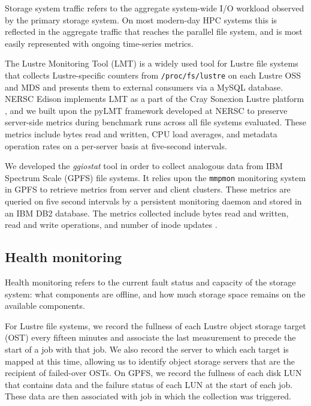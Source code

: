 Storage system traffic refers to the aggregate system-wide I/O workload
observed by the primary storage system.  On most modern-day HPC systems this
is reflected in the aggregate traffic that reaches the parallel file
system, and is most easily represented with ongoing time-series metrics.

\label{sec:methods/lmt}
The Lustre Monitoring Tool (LMT) is a widely used tool for Lustre file systems that collects Lustre-specific counters from \texttt{/proc/fs/lustre} on each Lustre OSS and MDS and presents them to external consumers via a MySQL database.
NERSC Edison implements LMT
as a part of the Cray Sonexion Lustre platform \cite{Keopp2014}, and we built
upon the pyLMT framework developed at NERSC \cite{Uselton2009} to preserve
server-side metrics during benchmark runs across all file systems evaluated.
These metrics include bytes read and written, CPU load averages, and metadata
operation rates on a per-server basis at five-second intervals.

\label{sec:methods/ggiostat}
We developed the \emph{ggiostat} tool in order to collect analogous data from
IBM Spectrum Scale (GPFS) file systems.    It relies upon the
\texttt{mmpmon} monitoring system in GPFS to retrieve metrics from server and
client clusters.  These metrics are queried on five second intervals by a
persistent monitoring daemon and stored in an IBM DB2 database.
The metrics collected include bytes read and written,
read and write operations, and number of inode updates . 

\subsection{Health monitoring }
\label{sec:methods/health}

Health monitoring refers to the current fault status and capacity of the
storage system: what components are offline, and how much storage space
remains on the available components.

For Lustre file systems, we record the fullness of each Lustre object storage target (OST) every fifteen minutes and associate the last measurement to precede the start of a job with that job.
We also record the server to which each target is mapped at this time, allowing us to identify object storage servers that are the recipient of failed-over OSTs.
On GPFS, we record the fullness of each disk LUN that contains data and the failure status of each LUN at the start of each job.
These data are then associated with job in which the collection was triggered.

